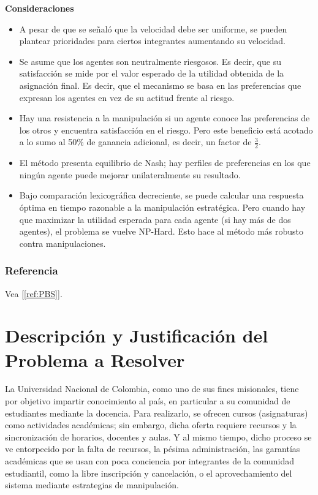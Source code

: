 \documentclass{article}
\begin{document}
\textbf{Consideraciones}

\begin{itemize}
  \item A pesar de que se señaló que la velocidad debe ser uniforme, se pueden plantear prioridades para
        ciertos integrantes aumentando su velocidad.
  \item Se asume que los agentes son neutralmente riesgosos. Es decir, que su satisfacción se mide 
        por el valor esperado de la utilidad obtenida de la asignación final. Es decir, que el mecanismo
        se basa en las preferencias que expresan los agentes en vez de su actitud frente al riesgo.
  \item Hay una resistencia a la manipulación si un agente conoce las preferencias de los otros
        y encuentra satisfacción en el riesgo. Pero este beneficio está acotado a lo sumo al 50\% de
        ganancia adicional, es decir, un factor de $\frac{3}{2}$.
  \item El método presenta equilibrio de Nash; hay perfiles de preferencias en los que ningún agente 
        puede mejorar unilateralmente su resultado.
  \item Bajo comparación lexicográfica decreciente, se puede calcular una respuesta óptima en tiempo 
        razonable a la manipulación estratégica. Pero cuando hay que maximizar la utilidad esperada
        para cada agente (si hay más de dos agentes), el problema se vuelve NP-Hard. Esto hace al 
        método más robusto contra manipulaciones.
\end{itemize}


\subsubsection{Referencia}
Vea [\ref{ref:PBS}].



\section{Descripción y Justificación del Problema a Resolver}\label{sec:descr}

La Universidad Nacional de Colombia, como uno de sus fines misionales, tiene por objetivo impartir 
conocimiento al país, en particular a su comunidad de estudiantes mediante la docencia. Para 
realizarlo, se ofrecen cursos (asignaturas) como actividades académicas; sin embargo, dicha oferta 
requiere recursos y la sincronización de horarios, docentes y aulas. Y al mismo tiempo, dicho proceso 
se ve entorpecido por la falta de recursos, la pésima administración, las garantías académicas que se 
usan con poca conciencia por integrantes de la comunidad estudiantil, como la libre inscripción y 
cancelación, o el aprovechamiento del sistema mediante estrategias de manipulación.
\end{document}
